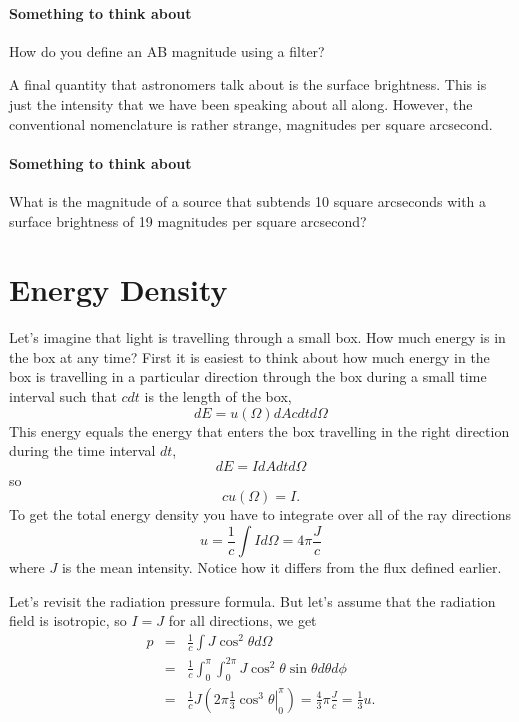 \paragraph{Something to think about}
How do you define an AB magnitude using a filter?

A final quantity that astronomers talk about is the surface
brightness.  This is just the intensity that we have been speaking
about all along.  However, the conventional nomenclature is rather strange,
magnitudes per square arcsecond.

\paragraph{Something to think about}
What is the magnitude of a source that subtends 10 square arcseconds
with a surface brightness of 19 magnitudes per square arcsecond?

\section{Energy Density}
\label{sec:energy-density}
Let's imagine that light is travelling through a small box.  How much
energy is in the box at any time?  First it is easiest to think about
how much energy in the box is travelling in a particular direction
through the box during a small time interval such that $c dt$ is the
length of the box,
\begin{equation}
d E = u(\Omega) d\!A c d t d\Omega
\label{eq:13}
\end{equation}
This energy equals the energy that enters the box travelling in the 
right direction during the time interval $dt$,
\begin{equation}
d E = I d\!A d t d\Omega
\label{eq:14}
\end{equation}
so
\begin{equation}
c u(\Omega) = I.
\label{eq:15}
\end{equation}
To get the total energy density you have to integrate over all of the 
ray directions
\begin{equation}
u = \frac{1}{c} \int I d \Omega = 4\pi \frac{J}{c}
\label{eq:16}
\end{equation}
where $J$ is the mean intensity.   Notice how it differs from the flux
defined earlier.

Let's revisit the radiation pressure formula.   But let's assume that
the radiation field is isotropic, so $I=J$ for all directions, we get
\begin{eqnarray}
\label{eq:17}
p &=& \frac{1}{c} \int J \cos^2\theta d \Omega \\
\label{eq:18}
  &=& \frac{1}{c} \int_0^\pi \int_0^{2\pi}J \cos^2\theta \sin\theta d\theta d \phi \\
  &=& \frac{1}{c} J \left ( 2 \pi \left . \frac{1}{3} \cos^3\theta \right |_0^\pi
  \right ) = \frac{4}{3} \pi \frac{J}{c} = \frac{1}{3} u.
\label{eq:19}
\end{eqnarray}


